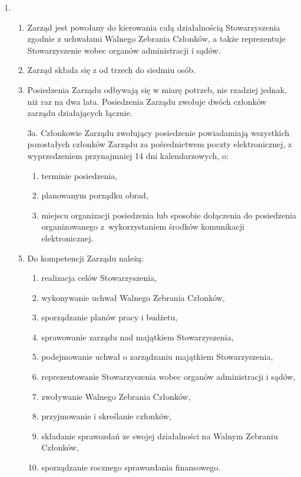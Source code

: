 \documentclass[chapterprefix,notitlepage]{article}
\begin{document}
\begin{enumerate}
	\item \begin{enumerate}
		\item Zarząd jest powołany do kierowania całą działalnością Stowarzyszenia zgodnie z uchwałami Walnego Zebrania Członków, a także reprezentuje Stowarzyszenie wobec organów administracji i sądów.
		\item Zarząd składa się z od trzech do siedmiu osób.
		\item Posiedzenia Zarządu odbywają się w miarę potrzeb, nie rzadziej jednak, niż raz na dwa lata. Posiedzenia Zarządu zwołuje dwóch członków zarządu działających łącznie.
		\item[3a.] Członkowie Zarządu zwołujący posiedzenie powiadamiają wszystkich pozostałych członków Zarządu za pośrednictwem poczty elektronicznej, z wyprzedzeniem przynajmniej 14 dni kalendarzowych, o:
		\begin{enumerate}
			\item terminie posiedzenia,
			\item planowanym porządku obrad,
			\item miejscu organizacji posiedzenia lub sposobie dołączenia do posiedzenia organizowanego z~wykorzystaniem środków komunikacji elektronicznej.
		\end{enumerate}
		\item Do kompetencji Zarządu należą:
		\begin{enumerate}
			\item realizacja celów Stowarzyszenia,
			\item wykonywanie uchwał Walnego Zebrania Członków,
			\item sporządzanie planów pracy i budżetu,
			\item sprawowanie zarządu nad majątkiem Stowarzyszenia,
			\item podejmowanie uchwał o zarządzaniu majątkiem Stowarzyszenia,
			\item reprezentowanie Stowarzyszenia wobec organów administracji i sądów,
			\item zwoływanie Walnego Zebrania Członków,
			\item przyjmowanie i skreślanie członków,
			\item składanie sprawozdań ze swojej działalności na Walnym Zebraniu Członków,
			\item sporządzanie rocznego sprawozdania finansowego.
		\end{enumerate}
	\end{enumerate}


\end{enumerate}
\end{document}
